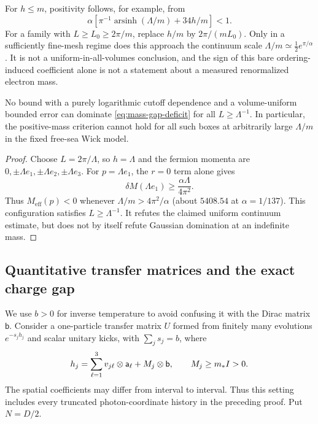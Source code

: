 For $h\le m$, positivity follows, for example, from
\begin{equation}
 \alpha\left[\pi^{-1}\operatorname{arsinh}(\Lambda/m)+34h/m\right]<1.
 \label{eq:mass-gap-resolved-window}
\end{equation}
For a family with $L\ge L_0\ge2\pi/m$, replace $h/m$ by $2\pi/(mL_0)$.
Only in a sufficiently fine-mesh regime does this approach the continuum
scale $\Lambda/m\simeq\frac12e^{\pi/\alpha}$.
It is not a uniform-in-all-volumes conclusion, and the sign of this bare
ordering-induced coefficient alone is not a statement about a measured
renormalized electron mass.

\begin{proposition}
\label{prop:mass-gap-coarse}
No bound with a purely logarithmic cutoff dependence and a volume-uniform
bounded error can dominate \eqref{eq:mass-gap-deficit} for all
$L\ge\Lambda^{-1}$. In particular, the positive-mass criterion cannot
hold for all such boxes at arbitrarily large $\Lambda/m$ in the fixed
free-sea Wick model.
\end{proposition}
\begin{proof}
Choose $L=2\pi/\Lambda$, so $h=\Lambda$ and the fermion momenta are
$0,\pm\Lambda e_1,\pm\Lambda e_2,\pm\Lambda e_3$.
For $p=\Lambda e_1$, the $r=0$ term alone gives
\begin{equation}
 \delta M(\Lambda e_1)\ge\frac{\alpha\Lambda}{4\pi^2}.
 \label{eq:mass-gap-coarse-lower}
\end{equation}
Thus $M_{\mathrm{eff}}(p)<0$ whenever
$\Lambda/m>4\pi^2/\alpha$ (about $5408.54$ at $\alpha=1/137$).
This configuration satisfies $L\ge\Lambda^{-1}$. It refutes the claimed
uniform continuum estimate, but does not by itself refute Gaussian
domination at an indefinite mass.
\end{proof}

\subsection{Quantitative transfer matrices and the exact charge gap}
\label{subsec:mass-gap-charge}

We use $b>0$ for inverse temperature to avoid confusing it with the
Dirac matrix $\mathsf b$. Consider a one-particle transfer matrix $U$
formed from finitely many evolutions $e^{-s_jh_j}$ and scalar unitary
kicks, with $\sum_js_j=b$, where
\[
 h_j=\sum_{\ell=1}^3v_{j\ell}\otimes\mathsf a_\ell
       +M_j\otimes\mathsf b,\qquad M_j\ge m_*I>0.
\]
The spatial coefficients may differ from interval to interval. Thus
this setting includes every truncated photon-coordinate history in the
preceding proof. Put $N=D/2$.


